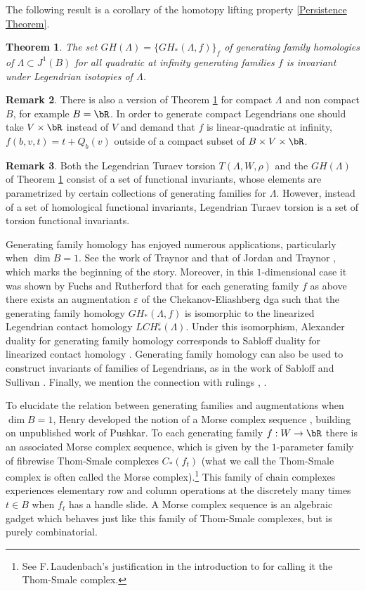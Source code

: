 \documentclass[JEP,XML,SOM,Unicode,NoFloatCountersInSection]{cedram}
\theoremstyle{plain}
\newtheorem{theorem}{Theorem}[section]
\theoremstyle{definition}
\newtheorem{remark}[theorem]{Remark}
\let\ve\varepsilon
\begin{document}
The following result is a corollary of the homotopy lifting property \ref{Persistence Theorem}.

\begin{theorem}\label{theorem: GF}
The set $GH(\Lambda)=\{ GH_*(\Lambda, f) \}_f $ of generating family homologies of $\Lambda \subset J^1(B)$ for all quadratic at infinity generating families $f$ is invariant under Legendrian isotopies of $\Lambda$.
\end{theorem}

\begin{remark}
There is also a version of Theorem \ref{theorem: GF} for compact $\Lambda$ and non compact $B$, for example $B=\bR$. In order to generate compact Legendrians one should take $V \times \bR$ instead of $V$ and demand that $f$ is linear-quadratic at infinity, \ie $f(b,v,t)=t+Q_b(v)$ outside of a compact subset of $B \times V \times \bR$.
\end{remark}

\begin{remark}
Both the Legendrian Turaev torsion $T(\Lambda, W, \rho)$ and the $GH(\Lambda)$ of Theorem \ref{theorem: GF} consist of a set of functional invariants, whose elements are parametrized by certain collections of generating families for $\Lambda$. However, instead of a set of homological functional invariants, Legendrian Turaev torsion is a set of torsion functional invariants.
\end{remark}

Generating family homology has enjoyed numerous applications, particularly when $\dim B =1$. See the work of Traynor \cite{T01} and that of Jordan and Traynor \cite{T06}, which marks the beginning of the story. Moreover, in this $1$-dimensional case it was shown by Fuchs and Rutherford \cite{FR11} that for each generating family $f$ as above there exists an augmentation $\ve$ of the Chekanov-Eliashberg dga such that the generating family homology $GH_*(\Lambda, f)$ is isomorphic to the linearized Legendrian contact homology $LCH^\ve_*(\Lambda)$. Under this isomorphism, Alexander duality for generating family homology corresponds to Sabloff duality for linearized contact homology \cite{S06}. Generating family homology can also be used to construct invariants of families of Legendrians, as in the work of Sabloff and Sullivan \cite{SS16}. Finally, we mention the connection with rulings \cite{FI04}, \cite{S05}.

To elucidate the relation between generating families and augmentations when $\dim B =1$, Henry developed the notion of a Morse complex sequence \cite{H04}, building on unpublished work of Pushkar. To each generating family $f:W \to \bR$ there is an associated Morse complex sequence, which is given by the $1$-parameter family of fibrewise Thom-Smale complexes $C_*(f_t)$ (what we call the Thom-Smale complex is often called the Morse complex).\footnote{See F.\,Laudenbach's justification in the introduction to \cite{La11} for calling it the Thom-Smale complex.} This family of chain complexes experiences elementary row and column operations at the discretely many times $t \in B$ when $f_t$ has a handle slide. A Morse complex sequence is an algebraic gadget which behaves just like this family of Thom-Smale complexes, but is purely combinatorial.
\end{document}
